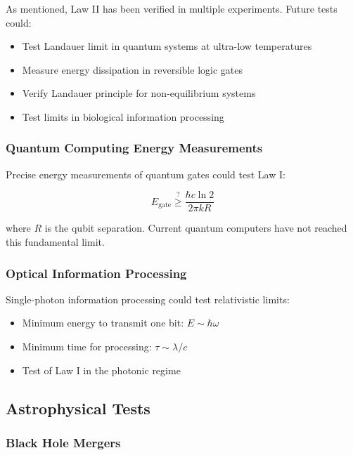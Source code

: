 \documentclass[11pt,a4paper]{article}
\theoremstyle{plain}
\theoremstyle{definition}
\theoremstyle{remark}
\begin{document}
As mentioned, Law II has been verified in multiple experiments. Future tests could:

\begin{itemize}[leftmargin=*]
\item Test Landauer limit in quantum systems at ultra-low temperatures
\item Measure energy dissipation in reversible logic gates
\item Verify Landauer principle for non-equilibrium systems
\item Test limits in biological information processing
\end{itemize}

\subsubsection{Quantum Computing Energy Measurements}

Precise energy measurements of quantum gates could test Law I:

\begin{equation}
E_{\text{gate}} \stackrel{?}{\geq} \frac{\hbar c\ln 2}{2\pi kR}
\end{equation}

where $R$ is the qubit separation. Current quantum computers have not reached this fundamental limit.

\subsubsection{Optical Information Processing}

Single-photon information processing could test relativistic limits:

\begin{itemize}[leftmargin=*]
\item Minimum energy to transmit one bit: $E \sim \hbar\omega$
\item Minimum time for processing: $\tau \sim \lambda/c$
\item Test of Law I in the photonic regime
\end{itemize}

\subsection{Astrophysical Tests}

\subsubsection{Black Hole Mergers}
\end{document}
